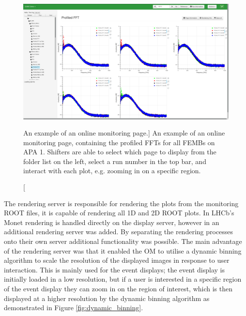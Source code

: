 \begin{figure}

	\centering

	\includegraphics[width=\textwidth]{figures/profiled_fft_monet.png}

	\caption
	[An example of an online monitoring page.] 
	{ An example of an online monitoring page, containing the profiled FFTs for
	all FEMBs on APA 1. Shifters are able to select which page to display from the
	folder list on the left, select a run number in the top bar, and interact 
	with each plot, e.g. zooming in on a specific region.} 
	\label{fig:monet_page}

\end{figure}

The rendering server is responsible for rendering the plots from the monitoring
ROOT files, it is capable of rendering all 1D and 2D ROOT plots. In LHCb's Monet
rendering is handled directly on the display server, however in \protodune{} an
additional rendering server was added. By separating the rendering processes 
onto their own server additional functionality was possible. The main 
advantage of the rendering server was that it enabled the OM to utilise a 
dynamic binning algorithm to scale the resolution of the displayed images in 
response to user interaction. This is mainly used for the event displays; the 
event display is initially loaded in a low resolution, but if a user is 
interested in a specific region of the event display they can zoom in on 
the region of interest, which is then displayed at a higher resolution by the 
dynamic binning algorithm as demonstrated in Figure \ref{fig:dynamic_binning}.

